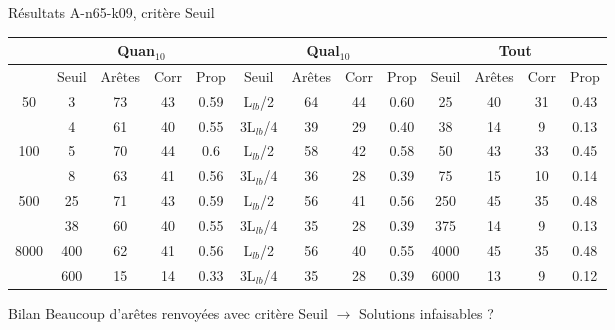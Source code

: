\documentclass{beamer}
\begin{document}
\begin{frame}{Résultats A-n65-k09, critère Seuil}

\begin{table}[H]

\begin{tabular}{|@{}c@{}|@{}c@{}|@{}c@{}|@{}c@{}|@{}c@{}||@{}c@{}|@{}c@{}|@{}c@{}|@{}c@{}||@{}c@{}|@{}c@{}|@{}c@{}|@{}c@{}|}

\hline
 & \multicolumn{4}{c|}{Quan$_{10}$} & \multicolumn{4}{c|}{Qual$_{10}$} & \multicolumn{4}{c|}{Tout} \\
 \hline
 & Seuil & Arêtes & Corr & Prop & Seuil & Arêtes & Corr & Prop & Seuil & Arêtes & Corr & Prop \\
 \hline
 50 & 3 & 73 & 43 & 0.59 & L$_{lb}$/2 & 64 & 44 & 0.60 & 25 & 40 & 31 & 0.43 \\
 \cline{2-13} 
    & 4 & 61 & 40 & 0.55 & 3L$_{lb}$/4 & 39 & 29 & 0.40 & 38 & 14 & 9 & 0.13 \\
  \hline
   100 & 5 & 70 & 44 & 0.6 & L$_{lb}$/2 & 58 & 42 & 0.58 & 50 & 43 & 33 & 0.45 \\
 \cline{2-13} 
    & 8 & 63 & 41 & 0.56 & 3L$_{lb}$/4 & 36 & 28 & 0.39 & 75 & 15 & 10 & 0.14 \\
  \hline
   500 & 25 & 71 & 43 & 0.59 & L$_{lb}$/2 & 56 & 41 & 0.56 & 250 & 45 & 35 & 0.48 \\
 \cline{2-13} 
    & 38 & 60 & 40 & 0.55 & 3L$_{lb}$/4 & 35 & 28 & 0.39 & 375 & 14 & 9 & 0.13 \\
  \hline
   8000 & 400 & 62 & 41 & 0.56 & L$_{lb}$/2 & 56 & 40 & 0.55 & 4000 & 45 & 35 & 0.48 \\
 \cline{2-13} 
    & 600 & 15 & 14 & 0.33 & 3L$_{lb}$/4 & 35 & 28 & 0.39 & 6000 & 13 & 9 & 0.12 \\
  \hline

\end{tabular}


\end{table}
\begin{block}{Bilan}
Beaucoup d'arêtes renvoyées avec critère Seuil $\rightarrow$ Solutions infaisables ?
\end{block}

\end{frame}
\end{document}
